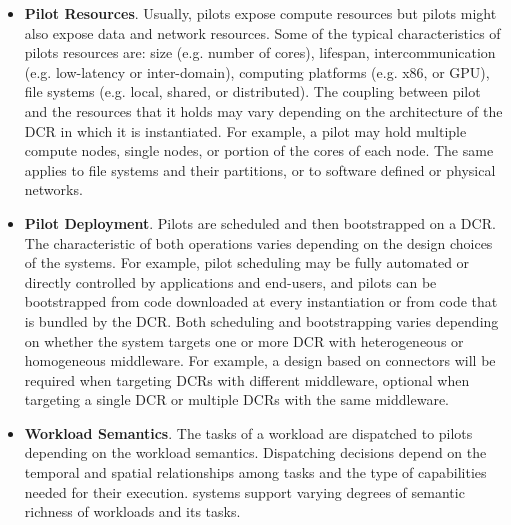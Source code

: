 \documentclass{sig-alternate}
\begin{document}
\begin{itemize}

\item \textbf{Pilot Resources}. Usually, pilots expose compute resources but
  pilots might also expose data and network resources. Some of the typical
  characteristics of pilots resources are: size (e.g. number of cores),
  lifespan, intercommunication (e.g. low-latency or inter-domain), computing
  platforms (e.g. x86, or GPU), file systems (e.g. local, shared, or
  distributed). The coupling between pilot and the resources that it holds may
  vary depending on the architecture of the DCR in which it is
  instantiated. For example, a pilot may hold multiple compute nodes, single
  nodes, or portion of the cores of each node. The same applies to file systems
  and their partitions, or to software defined or physical networks.


\item \textbf{Pilot Deployment}. Pilots are scheduled and then bootstrapped on a
  DCR. The characteristic of both operations varies depending on the design
  choices of the \pilot systems. For example, pilot scheduling may be fully
  automated or directly controlled by applications and end-users, and pilots can
  be bootstrapped from code downloaded at every instantiation or from code that
  is bundled by the DCR. Both scheduling and bootstrapping varies depending on
  whether the \pilot system targets one or more DCR with heterogeneous or
  homogeneous middleware. For example, a design based on connectors will be
  required when targeting DCRs with different middleware, optional when
  targeting a single DCR or multiple DCRs with the same middleware.  

\item \textbf{Workload Semantics}. The tasks of a workload are dispatched to
  pilots depending on the workload semantics. Dispatching decisions depend on
  the temporal and spatial relationships among tasks and the type of
  capabilities needed for their execution. \pilot systems support varying
  degrees of semantic richness of workloads and its tasks. 


\end{itemize}
\end{document}
